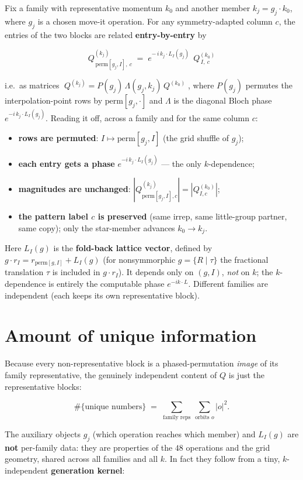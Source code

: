 \documentclass[11pt]{article}
\begin{document}
Fix a family with representative momentum $k_0$ and another member $k_j=g_j\cdot k_0$, where $g_j$ is
a chosen move-it operation. For any symmetry-adapted column $c$, the entries of the two blocks are
related \textbf{entry-by-entry} by

\[
  \boxed{\;Q^{(k_j)}_{\,\mathrm{perm}[g_j,I],\ c}
     \;=\; e^{-\,i\,k_j\cdot L_I(g_j)}\;\,Q^{(k_0)}_{\,I,\ c}\;}
\]

i.e.\ as matrices $\;Q^{(k_j)} = P(g_j)\,\Lambda(g_j,k_j)\,Q^{(k_0)}\;$, where $P(g_j)$ permutes the
interpolation-point rows by $\mathrm{perm}[g_j,\cdot]$ and $\Lambda$ is the diagonal Bloch phase
$e^{-i\,k_j\cdot L_I(g_j)}$. Reading it off, across a family and for the same column $c$:

\begin{itemize}[nosep]
  \item \textbf{rows are permuted}: $I\mapsto \mathrm{perm}[g_j,I]$ (the grid shuffle of $g_j$);
  \item \textbf{each entry gets a phase} $e^{-i\,k_j\cdot L_I(g_j)}$ --- the only $k$-dependence;
  \item \textbf{magnitudes are unchanged}: $|Q^{(k_j)}_{\mathrm{perm}[g_j,I],c}|=|Q^{(k_0)}_{I,c}|$;
  \item \textbf{the pattern label $c$ is preserved} (same irrep, same little-group partner, same
        copy); only the star-member advances $k_0\to k_j$.
\end{itemize}

Here $L_I(g)$ is the \textbf{fold-back lattice vector}, defined by
$g\cdot r_I = r_{\mathrm{perm}[g,I]} + L_I(g)$ (for nonsymmorphic $g=\{R\mid\tau\}$ the fractional
translation $\tau$ is included in $g\cdot r_I$). It depends only on $(g,I)$, \emph{not} on $k$; the
$k$-dependence is entirely the computable phase $e^{-ik\cdot L}$. Different families are independent
(each keeps its own representative block).

\section{Amount of unique information}

Because every non-representative block is a phased-permutation \emph{image} of its family
representative, the genuinely independent content of $Q$ is just the representative blocks:

\[
  \#\{\text{unique numbers}\}\;=\;\sum_{\text{family reps}}\ \sum_{\text{orbits }o}|o|^2 .
\]

The auxiliary objects $g_j$ (which operation reaches which member) and $L_I(g)$ are \textbf{not}
per-family data: they are properties of the $48$ operations and the grid geometry, shared across all
families and all $k$. In fact they follow from a tiny, $k$-independent \textbf{generation kernel}:
\end{document}
